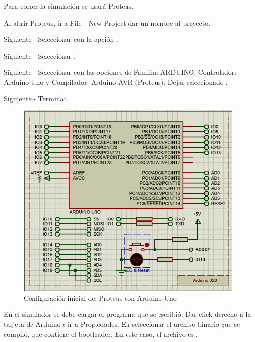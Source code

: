 \documentclass{article}
\begin{document}
Para correr la simulación se usará Proteus.

\bigbreak

Al abrir Proteus, ir a File - New Project dar un nombre al proyecto.

\bigbreak

Siguiente - Seleccionar  con la opción .

\bigbreak

Siguiente - Seleccionar .

\bigbreak

Siguiente - Seleccionar  con las opciones de Familia: ARDUINO, Controlador: 
Arduino Uno y Compilador: Arduino AVR (Proteus). Dejar seleccionado .

\bigbreak

Siguiente - Terminar.

\begin{figure}[H]
    \centering
    \includegraphics[width=0.5\paperwidth]{images/sim-1.png}
    \caption{Configuración inicial del Proteus con Arduino Uno}
\end{figure}

En el simulador se debe cargar el programa que se escribió. Dar click derecho a la tarjeta de Arduino e ir a
Propiedades. En  seleccionar el archivo binario que se compiló, que contiene el bootloader.
En este caso, el archivo es .
\end{document}
